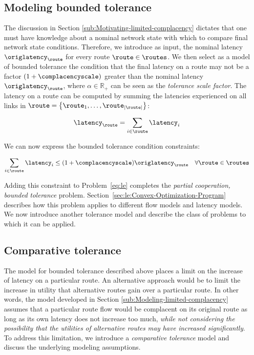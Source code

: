\subsection{Modeling bounded tolerance\label{sub:Modeling-limited-complacency}}

The discussion in Section \ref{sub:Motivating-limited-complacency}
dictates that one must have knowledge about a nominal network state
with which to compare final network state conditions. Therefore, we
introduce as input, the nominal latency $\origlatency_{\route}$ for
every route $\route\in\routes$. We then select as a model of bounded
tolerance the condition that the final latency on a route may not
be a factor $\left(1+\complacencyscale\right)$ greater than the nominal
latency $\origlatency_{\route}$, where $\alpha\in\mathbb{R}_{+}$
can be seen as the \emph{tolerance scale factor}. The latency on a
route can be computed by summing the latencies experienced on all
links in $\route=\left\{ \route_{1},\ldots,\route_{\left|\route\right|}\right\} $:

\[
\latency_{\route}=\sum_{\link\in\route}\latency_{\link}
\]


We can now express the bounded tolerance condition constraints:

\begin{eqnarray}
\sum_{\link\in\route}\latency_{\link} & \le\left(1+\complacencyscale\right)\origlatency_{\route} & \forall\route\in\routes\label{eq:limcomp-nonconvex}
\end{eqnarray}


Adding this constraint to Problem~\ref{eq:le} completes the \emph{partial
cooperation, bounded tolerance} problem. Section~\ref{sec:le:Convex-Optimization-Program}
describes how this problem applies to different flow models and latency
models. We now introduce another tolerance model and describe the
class of problems to which it can be applied.


\subsection{Comparative tolerance\label{sub:Comparative-complacency}}

The model for bounded tolerance described above places a limit on
the increase of latency on a particular route. An alternative approach
would be to limit the increase in utility that alternative routes
gain over a particular route. In other words, the model developed
in Section \ref{sub:Modeling-limited-complacency} assumes that a
particular route flow would be complacent on its original route as
long as its own latency does not increase too much, \emph{while not
considering the possibility that the utilities of alternative routes
may have increased significantly}. To address this limitation, we
introduce a \emph{comparative tolerance} model and discuss the underlying
modeling assumptions.

